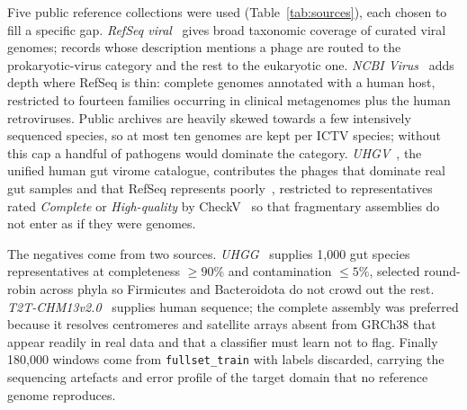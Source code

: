 \documentclass[10pt,twocolumn,a4paper]{article}
\begin{document}
Five public reference collections were used (Table~\ref{tab:sources}), each
chosen to fill a specific gap. \emph{RefSeq viral}~\cite{oleary2016refseq} gives
broad taxonomic coverage of curated viral genomes; records whose description
mentions a phage are routed to the prokaryotic-virus category and the rest to the
eukaryotic one. \emph{NCBI Virus}~\cite{hatcher2017ncbivirus} adds depth where RefSeq is thin: complete genomes annotated with a human host, restricted to fourteen
families occurring in clinical metagenomes plus the human retroviruses. Public
archives are heavily skewed towards a few intensively sequenced species, so at
most ten genomes are kept per ICTV species; without this cap a handful of
pathogens would dominate the category. \emph{UHGV}~\cite{camargo2025uhgv}, the
unified human gut virome catalogue, contributes the phages that dominate real gut
samples and that RefSeq represents poorly~\cite{shkoporov2019phages}, restricted
to representatives rated \emph{Complete} or \emph{High-quality} by
CheckV~\cite{nayfach2021checkv} so that fragmentary assemblies do not enter as if
they were genomes.

The negatives come from two sources. \emph{UHGG}~\cite{almeida2021uhgg} supplies
1{,}000 gut species representatives at completeness $\ge90\%$ and contamination
$\le5\%$, selected round-robin across phyla so Firmicutes and Bacteroidota do not
crowd out the rest. \emph{T2T-CHM13v2.0}~\cite{nurk2022t2t} supplies human
sequence; the complete assembly was preferred because it resolves centromeres and
satellite arrays absent from GRCh38 that appear readily in real data and that a
classifier must learn not to flag. Finally 180{,}000 windows come from
\texttt{fullset\_train} with labels discarded, carrying the sequencing artefacts
and error profile of the target domain that no reference genome reproduces.
\end{document}

